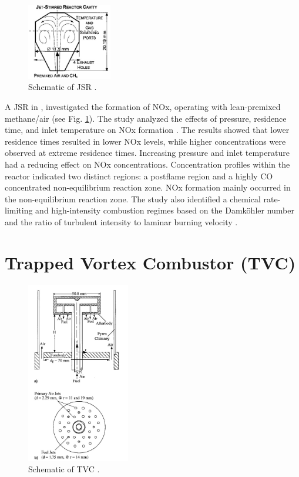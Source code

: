 \begin{figure}
    \centering
    \includegraphics[width=0.33\textwidth]{Chapter2/Images/JSR.jpeg}
  \caption[Schematic of JSR]{Schematic of JSR \cite{RUTAR20002435}.}
  \label{fig:JSR}
\end{figure}
A JSR in \cite{RUTAR20002435}, investigated the formation of NOx, operating with lean-premixed methane/air (see Fig. \ref{fig:JSR}). The study analyzed the effects of pressure, residence time, and inlet temperature on NOx formation \cite{RUTAR20002435}. The results showed that lower residence times resulted in lower NOx levels, while higher concentrations were observed at extreme residence times. Increasing pressure and inlet temperature had a reducing effect on NOx concentrations. Concentration profiles within the reactor indicated two distinct regions: a postflame region and a highly CO concentrated non-equilibrium reaction zone. NOx formation mainly occurred in the non-equilibrium reaction zone. The study also identified a chemical rate-limiting  and high-intensity combustion regimes based on the Damköhler number and the ratio of turbulent intensity to laminar burning velocity \cite{RUTAR20002435}.

\section{Trapped Vortex Combustor (TVC)}

\begin{figure}
    \centering    \includegraphics[width=0.4\textwidth]{Chapter2/Images/TVC.jpeg}
    \caption[Schematic of TVC]{Schematic of TVC \cite{TVC5266}.}
    \label{fig:TVC}
\end{figure}


